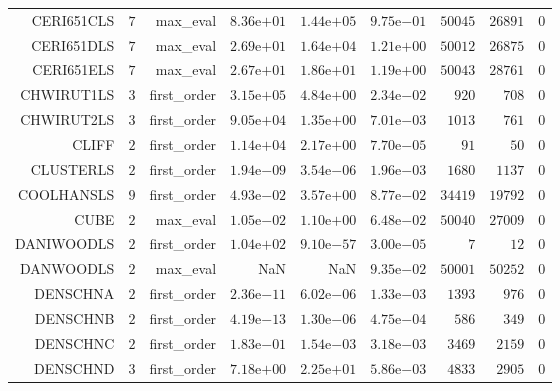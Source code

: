 \begin{longtable}{rrrrrrrrr}
CERI651CLS & \(     7\) & max\_eval & \( 8.36\)e\(+01\) & \( 1.44\)e\(+05\) & \( 9.75\)e\(-01\) & \( 50045\) & \( 26891\) & \(     0\) \\
CERI651DLS & \(     7\) & max\_eval & \( 2.69\)e\(+01\) & \( 1.64\)e\(+04\) & \( 1.21\)e\(+00\) & \( 50012\) & \( 26875\) & \(     0\) \\
CERI651ELS & \(     7\) & max\_eval & \( 2.67\)e\(+01\) & \( 1.86\)e\(+01\) & \( 1.19\)e\(+00\) & \( 50043\) & \( 28761\) & \(     0\) \\
CHWIRUT1LS & \(     3\) & first\_order & \( 3.15\)e\(+05\) & \( 4.84\)e\(+00\) & \( 2.34\)e\(-02\) & \(   920\) & \(   708\) & \(     0\) \\
CHWIRUT2LS & \(     3\) & first\_order & \( 9.05\)e\(+04\) & \( 1.35\)e\(+00\) & \( 7.01\)e\(-03\) & \(  1013\) & \(   761\) & \(     0\) \\
CLIFF & \(     2\) & first\_order & \( 1.14\)e\(+04\) & \( 2.17\)e\(+00\) & \( 7.70\)e\(-05\) & \(    91\) & \(    50\) & \(     0\) \\
CLUSTERLS & \(     2\) & first\_order & \( 1.94\)e\(-09\) & \( 3.54\)e\(-06\) & \( 1.96\)e\(-03\) & \(  1680\) & \(  1137\) & \(     0\) \\
COOLHANSLS & \(     9\) & first\_order & \( 4.93\)e\(-02\) & \( 3.57\)e\(+00\) & \( 8.77\)e\(-02\) & \( 34419\) & \( 19792\) & \(     0\) \\
CUBE & \(     2\) & max\_eval & \( 1.05\)e\(-02\) & \( 1.10\)e\(+00\) & \( 6.48\)e\(-02\) & \( 50040\) & \( 27009\) & \(     0\) \\
DANIWOODLS & \(     2\) & first\_order & \( 1.04\)e\(+02\) & \( 9.10\)e\(-57\) & \( 3.00\)e\(-05\) & \(     7\) & \(    12\) & \(     0\) \\
DANWOODLS & \(     2\) & max\_eval &       NaN &       NaN & \( 9.35\)e\(-02\) & \( 50001\) & \( 50252\) & \(     0\) \\
DENSCHNA & \(     2\) & first\_order & \( 2.36\)e\(-11\) & \( 6.02\)e\(-06\) & \( 1.33\)e\(-03\) & \(  1393\) & \(   976\) & \(     0\) \\
DENSCHNB & \(     2\) & first\_order & \( 4.19\)e\(-13\) & \( 1.30\)e\(-06\) & \( 4.75\)e\(-04\) & \(   586\) & \(   349\) & \(     0\) \\
DENSCHNC & \(     2\) & first\_order & \( 1.83\)e\(-01\) & \( 1.54\)e\(-03\) & \( 3.18\)e\(-03\) & \(  3469\) & \(  2159\) & \(     0\) \\
DENSCHND & \(     3\) & first\_order & \( 7.18\)e\(+00\) & \( 2.25\)e\(+01\) & \( 5.86\)e\(-03\) & \(  4833\) & \(  2905\) & \(     0\) \\

\end{longtable}
